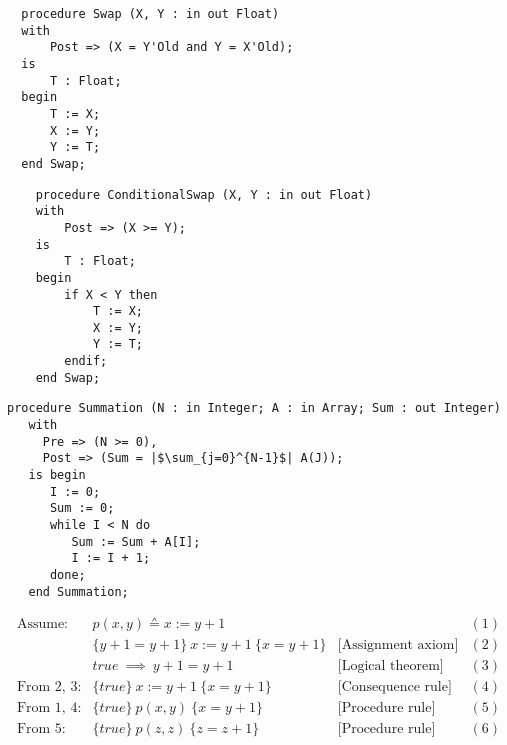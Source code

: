 \documentclass[11pt]{article}
\begin{document}
\vfill


\lstset{aboveskip=3mm}
\begin{lstlisting}
  procedure Swap (X, Y : in out Float)
  with
      Post => (X = Y'Old and Y = X'Old);
  is 
      T : Float;
  begin
      T := X;
      X := Y; 
      Y := T;
  end Swap;
\end{lstlisting}

\vfill 

\pagebreak

\lstset{aboveskip=3mm}
\begin{lstlisting}
    procedure ConditionalSwap (X, Y : in out Float)
    with
        Post => (X >= Y);
    is 
        T : Float;
    begin
        if X < Y then
            T := X;
            X := Y; 
            Y := T;
        endif;
    end Swap;
\end{lstlisting}

\vfill


\lstset{aboveskip=3mm}
\begin{lstlisting}[escapeinside={||}]
   procedure Summation (N : in Integer; A : in Array; Sum : out Integer)
   with
     Pre => (N >= 0),
     Post => (Sum = |$\sum_{j=0}^{N-1}$| A(J));
   is begin
      I := 0;
      Sum := 0;
      while I < N do
         Sum := Sum + A[I];
         I := I + 1;
      done;
   end Summation;
\end{lstlisting}

\vfill
\begin{displaymath}
  \begin{array}{lllll}
\textrm{Assume:} & p(x, y) \sdef x := y + 1 & & (1)\\[2mm]
                 & \{y + 1 = y + 1\}~ x := y + 1~ \{x = y + 1\} & \textrm{[Assignment axiom]} & (2)\\[2mm]
                 & true ~\implies ~ y + 1 = y + 1 & \textrm{[Logical theorem]} & (3)\\[2mm]
 \textrm{From 2, 3:} & \{true\}~ x := y + 1~ \{x = y + 1\} & \textrm{[Consequence rule]} & (4)\\[2mm]
 \textrm{From 1, 4:} & \{true\}~ p(x,y)~ \{ x = y + 1\} & \textrm{[Procedure rule]} & (5)\\[2mm]
 \textrm{From 5:}    & \{true\}~ p(z,z)~ \{ z = z + 1\} & \textrm{[Procedure rule]} & (6)
\end{array}
\end{displaymath}

\vfill

\pagebreak

\vfill
\end{document}
